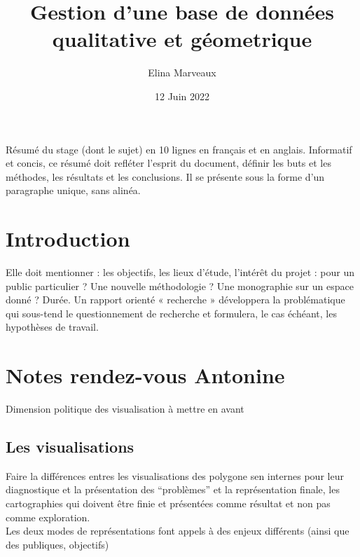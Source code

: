 \documentclass[
  12pt,
  a4paper,
]{scrbook}
\title{Gestion d'une base de données qualitative et géometrique}
\author{Elina Marveaux}
\date{12 Juin 2022}
\renewcommand*\contentsname{Table of contents}
\newcommand\contentsname{Table of contents}
\begin{document}
\frontmatter
\maketitle
Résumé du stage (dont le sujet) en 10 lignes en français et en anglais. Informatif et concis, ce résumé doit refléter l'esprit du document, définir les buts et les méthodes, les résultats et les conclusions. Il se présente sous la forme d'un paragraphe unique, sans alinéa.

\renewcommand*\contentsname{Table des matières}
{
\setcounter{tocdepth}{2}
\tableofcontents
}
\mainmatter
{}

\hypertarget{introduction}{%
\chapter*{Introduction}\label{introduction}}

Elle doit mentionner : les objectifs, les lieux d'étude, l'intérêt du
projet : pour un public particulier ? Une nouvelle méthodologie ? Une
monographie sur un espace donné ? Durée. Un rapport orienté « recherche
» développera la problématique qui sous-tend le questionnement de
recherche et formulera, le cas échéant, les hypothèses de travail.


\hypertarget{notes-rendez-vous-antonine}{%
\chapter*{Notes rendez-vous Antonine}\label{notes-rendez-vous-antonine}}

Dimension politique des visualisation à mettre en avant

\hypertarget{les-visualisations}{%
\section*{Les visualisations}\label{les-visualisations}}

Faire la différences entres les visualisations des polygone sen internes
pour leur diagnostique et la présentation des ``problèmes'' et la
représentation finale, les cartographies qui doivent être finie et
présentées comme résultat et non pas comme exploration.\\
Les deux modes de représentations font appels à des enjeux différents
(ainsi que des publiques, objectifs)
\end{document}
